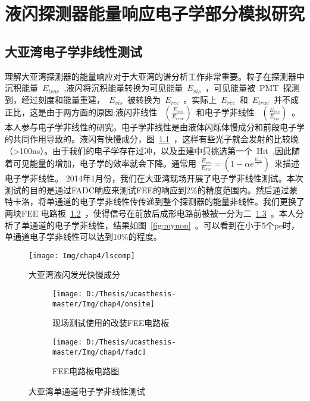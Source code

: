 
\chapter{液闪探测器能量响应电子学部分模拟研究}
\label{chap:chap4}


\section{大亚湾电子学非线性测试}
理解大亚湾探测器的能量响应对于大亚湾的谱分析工作非常重要。粒子在探测器中沉积能量~$E_{true}$~,液闪将沉积能量转换为可见能量~$E_{vis}$~，可见能量被~PMT~探测到，经过刻度和能量重建，~$E_{vis}$~被转换为~$E_{rec}$~。实际上~$E_{rec}$~和~$E_{true}$~并不成正比，这是由于两方面的原因:液闪非线性
~$\left( \frac{E_{vis}}{E_{true}} \right)$~和电子学非线性
~$\left( \frac{E_{rec}}{E_{vis}} \right)$~。本人参与电子学非线性的研究。电子学非线性是由液体闪烁体慢成分和前段电子学的共同作用导致的。液闪有快慢成分，图~\ref{fig:lscomp}~，这样有些光子就会发射的比较晚（>100ns）。由于我们的电子学存在过冲，以及重建中只挑选第一个~Hit~,因此随着可见能量的增加，电子学的效率就会下降。通常用~$\frac{E_{vis}}{E_{rec}}=(1-\alpha e^{\frac{E_{rec}}{r}})$~来描述电子学非线性。
2014年1月份，我们在大亚湾现场开展了电子学非线性测试。本次测试的目的是通过FADC响应来测试FEE的响应到2\%的精度范围内。然后通过蒙特卡洛，将单通道的电子学非线性传传递到整个探测器的能量非线性。我们更换了两块FEE 电路板~\ref{fig:onsite_1}~，使得信号在前放后成形电路前被被一分为二~\ref{fig:onsite_2}~。本人分析了单通道的电子学非线性，结果如图~\ref{fig:mynon}~。可以看到在小于5个pe时，单通道电子学非线性可以达到10\%的程度。

\begin{figure}[!htbp]
  \centering
   \texttt{[image: Img/chap4/lscomp]}
    \caption{大亚湾液闪发光快慢成分}
  \label{fig:lscomp}
\end{figure}



\begin{figure}[!htbp]
  \centering
  \begin{subfigure}[b]{\MySubFactor\textwidth}
  \texttt{[image: D:/Thesis/ucasthesis-master/Img/chap4/onsite]}
    \caption{现场测试使用的改装FEE电路板}
    \label{fig:onsite_1}
  \end{subfigure}%
  \quad%
  \begin{subfigure}[b]{\MySubFactor\textwidth}
    \texttt{[image: D:/Thesis/ucasthesis-master/Img/chap4/fadc]}
    \caption{FEE电路板电路图}
    \label{fig:onsite_2}
  \end{subfigure}
    \caption{大亚湾单通道电子学非线性测试}
  \label{fig:onsite}
\end{figure}



